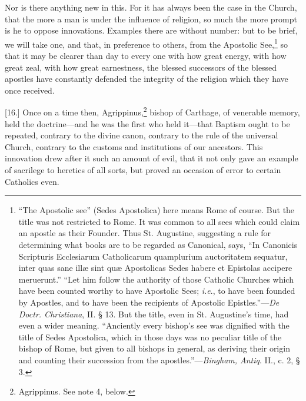 Nor is there anything new in this. For it has always been the case in the Church, that the more a man is under the influence of religion, so much the more prompt is he to oppose innovations. Examples there are without number: but to be brief, we will take one, and that, in preference to others, from the Apostolic See,\footnote{“The Apostolic see” (Sedes Apostolica) here means Rome of course. But the title was not restricted to Rome. It was common to all sees which could claim an apostle as their Founder. Thus St. Augustine, suggesting a rule for determining what books are to be regarded as Canonical, says, “In Canonicis Scripturis Ecclesiarum Catholicarum quamplurium auctoritatem sequatur, inter quas sane illæ sint quæ Apostolicas Sedes habere et Epistolas accipere meruerunt.” “Let him follow the authority of those Catholic Churches which have been counted worthy to have Apostolic Sees; \emph{i.e}., to have been founded by Apostles, and to have been the recipients of Apostolic Epistles.”—\emph{De Doctr. Christiana}, II. § 13. But the title, even in St. Augustine’s time, had even a wider meaning. “Anciently every bishop’s see was dignified with the title of Sedes Apostolica, which in those days was no peculiar title of the bishop of Rome, but given to all bishops in general, as deriving their origin and counting their succession from the apostles.”—\emph{Bingham, Antiq}. II., c. 2, § 3.} so that it may be clearer than day to every one with how great energy, with how great zeal, with how great earnestness, the blessed successors of the blessed apostles have constantly defended the integrity of the religion which they have once received.

[16.] Once on a time then, Agrippinus,\footnote{Agrippinus. See note 4, below.} bishop of Carthage, of venerable memory, held the doctrine—and he was the first who held it—that Baptism ought to be repeated, contrary to the divine canon, contrary to the rule of the universal Church, contrary to the customs and institutions of our ancestors. This innovation drew after it such an amount of evil, that it not only gave an example of sacrilege to heretics of all sorts, but proved an occasion of error to certain Catholics even.

